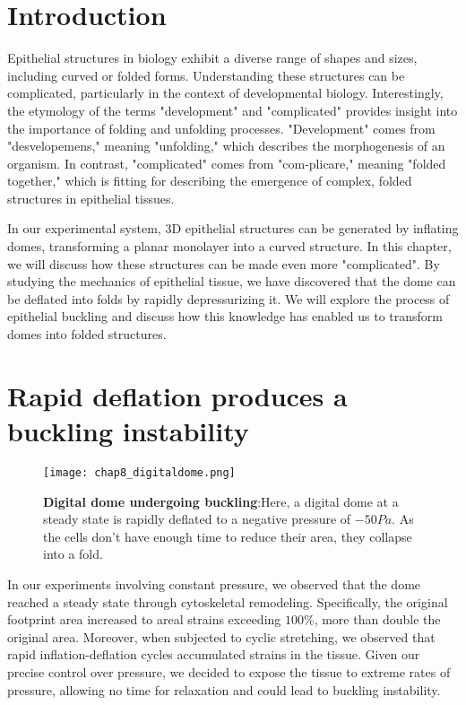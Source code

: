 \hypertarget{introduction}{%
\section{Introduction}\label{introduction5}}

Epithelial structures in biology exhibit a diverse range of shapes and sizes, including curved or folded forms. Understanding these structures can be complicated, particularly in the context of developmental biology. Interestingly, the etymology of the terms "development" and "complicated" provides insight into the importance of folding and unfolding processes. "Development" comes from "desvelopemens," meaning "unfolding," which describes the morphogenesis of an organism. In contrast, "complicated" comes from "com-plicare," meaning "folded together," which is fitting for describing the emergence of complex, folded structures in epithelial tissues.

In our experimental system, 3D epithelial structures can be generated by inflating domes, transforming a planar monolayer into a curved structure. In this chapter, we will discuss how these structures can be made even more "complicated". By studying the mechanics of epithelial tissue, we have discovered that the dome can be deflated into folds by rapidly depressurizing it. We will explore the process of epithelial buckling and discuss how this knowledge has enabled us to transform domes into folded structures.

\hypertarget{rapid-deflation-produces-a-buckling-instability}{%
	\section{Rapid deflation produces a buckling
		instability}\label{rapid-deflation-produces-a-buckling-instability}}

\begin{figure}
	\centering
	\texttt{[image: chap8\_digitaldome.png]}
	\caption{\label{fig_8_1} \textbf{Digital dome undergoing buckling}:Here, a digital dome at a steady state is rapidly deflated to a negative pressure of $-50Pa$. As the cells don't have enough time to reduce their area, they collapse into a fold.
	}
\end{figure}

In our experiments involving constant pressure, we observed that the dome reached a steady state through cytoskeletal remodeling. Specifically, the original footprint area increased to areal strains exceeding $100\%$, more than double the original area. Moreover, when subjected to cyclic stretching, we observed that rapid inflation-deflation cycles accumulated strains in the tissue. Given our precise control over pressure, we decided to expose the tissue to extreme rates of pressure, allowing no time for relaxation and could lead to buckling instability.

